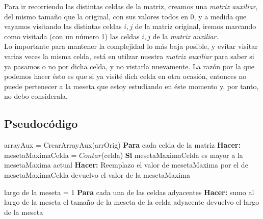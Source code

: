 Para ir recorriendo las distintas celdas de la matriz, creamos una \textit{matriz auxiliar}, del mismo tamaño que la original, con sus valores todos en 0, y a medida que vayamos visitando las distintas celdas $i,j$ de la matriz original, iremos marcando como visitada (con un número 1) las celdas $i,j$ de la \textit{matriz auxiliar}. \\
Lo importante para mantener la complejidad lo más baja posible, y evitar visitar varias veces la misma celda, está en utilzar nuestra \textit{matriz auxiliar} para saber si ya pasamos o no por dicha celda, y no vistarla nuevamente. La razón por la que podemos hacer ésto es que si ya visité dich celda en otra ocasión, entonces no puede pertenecer a la meseta que estoy estudiando en éste momento y, por tanto, no debo considerala.

\subsection{Pseudoc\'odigo}

\begin{codebox}
\li	arrayAux = CrearArrayAux(arrOrig)
\li	\textbf{Para} cada celda de la matriz \textbf{Hacer:} \Do
\li	mesetaMaximaCelda = $Contar$(celda)
\li	\textbf{Si} mesetaMaximaCelda es mayor a la mesetaMaxima actual \textbf{Hacer:} \Do
\li	Reemplazo el valor de mesetaMaxima por el de mesetaMaximaCelda
\End
\End
\li	devuelvo el valor de la mesetaMaxima
\end{codebox}

\begin{codebox}
\li	largo de la meseta = 1
\li	\textbf{Para} cada una de las celdas adyacentes \textbf{Hacer:} \Do 
\li	sumo al largo de la meseta el tamaño de la meseta de la celda adyacente
\End
\li	devuelvo el largo de la meseta
\end{codebox}

